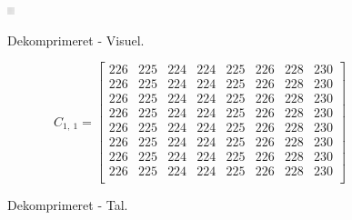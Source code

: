\begin{figure}[htbp]
\begin{minipage}[b]{0.27\linewidth}
\centering
\includegraphics[width=\textwidth]{Billeder/LenaAnvendelse/RED8x8/lena4-R8x8-compressed.png}
\caption{Dekomprimeret - Visuel.}
\label{fig:lena4-R8x8-compressed-visuel}
\end{minipage}
\hspace{0.5cm}
\begin{minipage}[b]{0.45\linewidth}
\centering
\[C_{1,\ 1}=\begin{bmatrix}
226 & 225 & 224 & 224 & 225 & 226 & 228 & 230 \\
226 & 225 & 224 & 224 & 225 & 226 & 228 & 230 \\
226 & 225 & 224 & 224 & 225 & 226 & 228 & 230 \\
226 & 225 & 224 & 224 & 225 & 226 & 228 & 230 \\
226 & 225 & 224 & 224 & 225 & 226 & 228 & 230 \\
226 & 225 & 224 & 224 & 225 & 226 & 228 & 230 \\
226 & 225 & 224 & 224 & 225 & 226 & 228 & 230 \\
226 & 225 & 224 & 224 & 225 & 226 & 228 & 230 \\
\end{bmatrix}\]
\caption{Dekomprimeret - Tal.}
\label{fig:lena4-R8x8-decompressed-matrix}
\end{minipage}
\end{figure}

